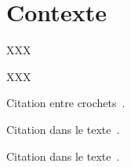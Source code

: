 \chapter*{Contexte}
\label{chap:contexte}


XXX


XXX


Citation entre crochets~\citep{Lopes07,Lopes10}.

Citation dans le texte~\citet{Aguilar11}.

Citation dans le texte~\cite{Aguilar11}.

